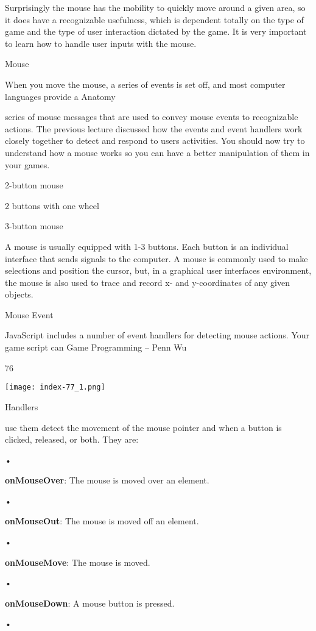 \documentclass[
]{article}
\begin{document}
Surprisingly the mouse has the mobility to quickly move around a given
area, so it does have a recognizable usefulness, which is dependent
totally on the type of game and the type of user interaction dictated by
the game. It is very important to learn how to handle user inputs with
the mouse.

Mouse

When you move the mouse, a series of events is set off, and most
computer languages provide a Anatomy

series of mouse messages that are used to convey mouse events to
recognizable actions. The previous lecture discussed how the events and
event handlers work closely together to detect and respond to
user\textquotesingle s activities. You should now try to understand how
a mouse works so you can have a better manipulation of them in your
games.

2-button mouse

2 buttons with one wheel

3-button mouse

A mouse is usually equipped with 1-3 buttons. Each button is an
individual interface that sends signals to the computer. A mouse is
commonly used to make selections and position the cursor, but, in a
graphical user interfaces environment, the mouse is also used to trace
and record x- and y-coordinates of any given objects.

Mouse Event

JavaScript includes a number of event handlers for detecting mouse
actions. Your game script can Game Programming -- Penn Wu

76

\protect\hypertarget{index_split_006.htmlux5cux23p77}{}{}\texttt{[image: index-77\_1.png]}

Handlers

use them detect the movement of the mouse pointer and when a button is
clicked, released, or both. They are:

•

\textbf{onMouseOver}: The mouse is moved over an element.

•

\textbf{onMouseOut}: The mouse is moved off an element.

•

\textbf{onMouseMove}: The mouse is moved.

•

\textbf{onMouseDown}: A mouse button is pressed.

•
\end{document}
